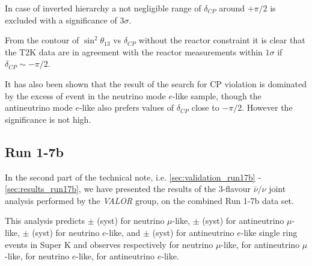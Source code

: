 In case of inverted hierarchy a not negligible range of $\delta_{CP}$ around $+\pi/2$ is excluded with 
a significance of $3\sigma$.

From the contour of $\sin^2 \theta_{13}$ vs $\delta_{CP}$ without the reactor constraint 
it is clear that the T2K data are in agreement with the reactor measurements within $1\sigma$ 
if $\delta_{CP} \sim -\pi/2$.

It has also been shown that the result of the search for CP violation is dominated by the excess of event in the neutrino mode
$e$-like sample, though the antineutrino mode $e$-like also prefers values of $\delta_{CP}$ close to $-\pi/2$.
However the significance is not high.




\subsection{Run 1-7b}
\label{sec:summary_run17b}

In the second part of the technical note,
i.e. \cref{sec:validation_run17b} - \ref{sec:results_run17b},
we have presented the results of the 3-flavour $\bar{\nu}/\nu$ joint analysis
performed by the {\em VALOR} group,
on the combined Run 1-7b data set.

This analysis predicts 
\NskOscExpectationNumuRunOneSevenB{} $\pm$ \NskOscExpectationNumuErrorRunOneSevenB{} (syst) for neutrino $\mu$-like,
\NskOscExpectationNumuBarRunOneSevenB{} $\pm$ \NskOscExpectationNumuBarErrorRunOneSevenB{} (syst) for antineutrino $\mu$-like,
\NskOscExpectationNueRunOneSevenB{} $\pm$ \NskOscExpectationNueErrorRunOneSevenB{} (syst) for neutrino $e$-like,
and
\NskOscExpectationNueBarRunOneSevenB{} $\pm$ \NskOscExpectationNueBarErrorRunOneSevenB{} (syst) for antineutrino $e$-like
single ring events in Super K
and observes respectively 
\NskObservedNumuRunOneSevenB{} for neutrino $\mu$-like,
\NskObservedNumuBarRunOneSevenB{}  for antineutrino $\mu$-like,
\NskObservedNueRunOneSevenB{}  for neutrino $e$-like,
\NskObservedNueBarRunOneSevenB{}  for antineutrino $e$-like.

